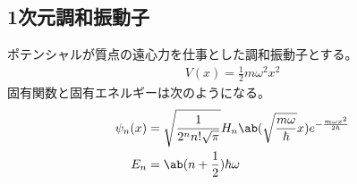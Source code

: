 \documentclass[uplatex,dvipdfmx,a4paper,11pt]{jlreq}
\numberwithin{equation}{section}
\theoremstyle{definition}
\begin{document}
\subsection{1次元調和振動子}
\begin{proposition}
  ポテンシャルが質点の遠心力を仕事とした調和振動子とする。
  \begin{align}
    V(x) = \frac{1}{2}m\omega^2x^2
  \end{align}
  固有関数と固有エネルギーは次のようになる。
  \begin{align}
    \psi_n(x) & = \sqrt{\frac{1}{2^nn!\sqrt{\pi}}}H_n\ab(\sqrt{\frac{m\omega}{\hbar}}x)e^{-\frac{m\omega x^2}{2\hbar}} \\
    E_n       & = \ab(n + \frac{1}{2})\hbar\omega
  \end{align}
\end{proposition}
\end{document}
